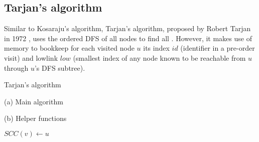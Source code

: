 \subsection{Tarjan's algorithm} \label{algorithm-scc-tarjan}
Similar to Kosaraju's algorithm, Tarjan's algorithm, proposed by Robert Tarjan in 1972 \cite{tarjan72}, uses the ordered DFS of all nodes to find all . However, it makes use of memory to bookkeep for each visited node $u$ its index $id$ (identifier in a pre-order visit) and lowlink $low$ (smallest index of any node known to be reachable from $u$ through $u$'s DFS subtree).
\begin{algorithm}[ht]
    \caption{Tarjan's algorithm}
    \label{alg-tarjan}
    \begin{minipage}[t]{0.40\linewidth}
        (a) Main algorithm
        \begin{algorithmic}[1]
                \EndFor
                    \EndIf
                \EndFor
                \State {}
            \EndFunction
        \end{algorithmic}
    \end{minipage}
    \begin{minipage}[t]{0.58\textwidth}
        (b) Helper functions
        \begin{algorithmic}[1]

                 \label{alg-line:tarjan-dfs-assign-low-init}
                    \label{alg-line:tarjan-dfs-cycle-begin}
                    \EndIf
                \EndFor
                \label{alg-line:tarjan-dfs-cycle-end}
                        {$SCC(v) \gets u$}
                    \EndWhile
                \EndIf
            \EndFunction
        \end{algorithmic}
    \end{minipage}
\end{algorithm}
